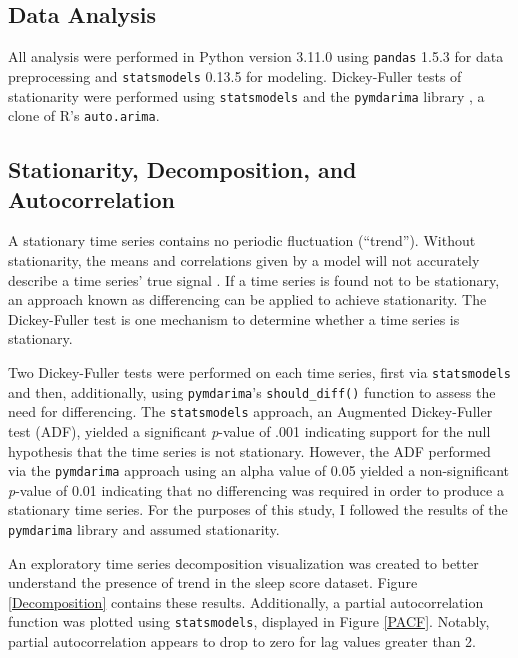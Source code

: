 \documentclass{article}
\begin{document}
\hypertarget{data-analysis}{%
\subsection{Data Analysis}\label{data-analysis}}

All analysis were performed in Python version 3.11.0 \citep{Python} using
\texttt{pandas} 1.5.3 \citep{reback2020pandas} for data preprocessing and
\texttt{statsmodels} 0.13.5 \citep{seabold2010statsmodels} for modeling.
Dickey-Fuller tests of stationarity were performed using \texttt{statsmodels}
and the \texttt{pymdarima} library \citep{pmdarima}, a clone of R's
\texttt{auto.arima}.

\hypertarget{stationarity-decomposition-and-autocorrelation}{%
\subsection{Stationarity, Decomposition, and
Autocorrelation}\label{stationarity-decomposition-and-autocorrelation}}

A stationary time series contains no periodic fluctuation (``trend''). Without
stationarity, the means and correlations given by a model will not accurately
describe a time series' true signal \citep{boseVector2017}. If a time series is
found not to be stationary, an approach known as differencing can be applied to
achieve stationarity. The Dickey-Fuller test is one mechanism to determine
whether a time series is stationary.

Two Dickey-Fuller tests were performed on each time series, first via
\texttt{statsmodels} and then, additionally, using \texttt{pymdarima}'s
\texttt{should\_diff()} function to assess the need for differencing. The
\texttt{statsmodels} approach, an Augmented Dickey-Fuller test (ADF), yielded a
significant \textit{p}-value of .001 indicating support for the null hypothesis
that the time series is not stationary. However, the ADF performed via the \texttt{pymdarima} approach
using an alpha value of 0.05 yielded a non-significant \textit{p}-value of 0.01
indicating that no differencing was required in order to produce a stationary
time series. For the purposes of this study, I followed the results of the
\texttt{pymdarima} library and assumed stationarity.

An exploratory time series decomposition visualization was created to better
understand the presence of trend in the sleep score dataset. Figure
\ref{Decomposition} contains these results. Additionally, a partial
autocorrelation function was plotted using \texttt{statsmodels}, displayed in
Figure \ref{PACF}. Notably, partial autocorrelation appears to drop to zero for
lag values greater than 2.
\end{document}
